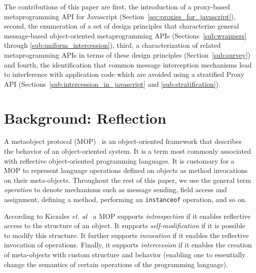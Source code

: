\documentclass{sig-alternate}
\begin{document}
The contributions of this paper are first, the introduction of a proxy-based metaprogramming API for Javascript (Section~\ref{sec:proxies_for_javascript}), second, the enumeration of a set of design principles that characterize general message-based object-oriented metaprogramming APIs (Sections~\ref{sub:wrappers} through \ref{sub:uniform_intercession}), third, a characterization of related metaprogramming APIs in terms of these design principles (Section~\ref{sub:survey}) and fourth, the identification that common message interception mechanisms lead to interference with application code which are avoided using a stratified Proxy API (Sections~\ref{sub:intercession_in_javascript} and \ref{sub:stratification}).

\section{Background: Reflection}
\label{sec:reflection}



A metaobject protocol (MOP)~\cite{kiczales91art} is an object-oriented framework that describes the behavior of an object-oriented system. It is a term most commonly associated with reflective object-oriented programming languages. It is customary for a MOP to represent language operations defined on objects as method invocations on their meta-objects. Throughout the rest of this paper, we use the general term \emph{operation} to denote mechanisms such as message sending, field access and assignment, defining a method, performing an \texttt{instanceof} operation, and so on.

According to Kiczales \emph{et. al}~\cite{kiczales91art} a MOP supports \emph{introspection} if it enables reflective access to the structure of an object. It supports \emph{self-modification} if it is possible to modify this structure. It further supports \emph{invocation} if it enables the reflective invocation of operations. Finally, it supports \emph{intercession} if it enables the creation of meta-objects with custom structure and behavior (enabling one to essentially change the semantics of certain operations of the programming language).
\end{document}
